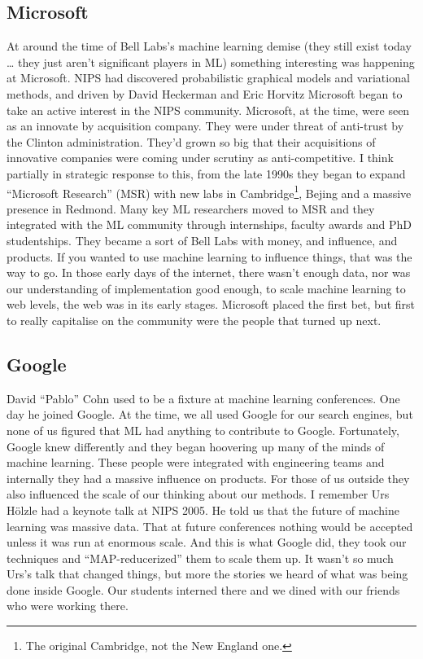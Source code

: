 \documentclass[a4paper]{caesar_book}
\begin{document}
\subsection{Microsoft}

At around the time of Bell Labs’s machine learning demise (they still exist today … they just aren't significant players in ML) something interesting was happening at Microsoft. NIPS had discovered probabilistic graphical models and variational methods, and driven by David Heckerman and Eric Horvitz Microsoft began to take an active interest in the NIPS community. Microsoft, at the time, were seen as an innovate by acquisition company. They were under threat of anti-trust by the Clinton administration. They’d grown so big that their acquisitions of innovative companies were coming under scrutiny as anti-competitive. I think partially in strategic response to this, from the late 1990s they began to expand “Microsoft Research” (MSR) with new labs in Cambridge\footnote{The original Cambridge, not the New England one.}, Bejing and a massive presence in Redmond. Many key ML researchers moved to MSR and they integrated with the ML community through internships, faculty awards and PhD studentships. They became a sort of Bell Labs with money, and influence, and products. If you wanted to use machine learning to influence things, that was the way to go. In those early days of the internet, there wasn’t enough data, nor was our understanding of implementation good enough, to scale machine learning to web levels, the web was in its early stages. Microsoft placed the first bet, but first to really capitalise on the community were the people that turned up next.

\subsection{Google}

David “Pablo” Cohn used to be a fixture at machine learning conferences. One day he joined Google. At the time, we all used Google for our search engines, but none of us figured that ML had anything to contribute to Google. Fortunately, Google knew differently and they began hoovering up many of the minds of machine learning. These people were integrated with engineering teams and internally they had a massive influence on products. For those of us outside they also influenced the scale of our thinking about our methods. I remember Urs Hölzle had a keynote talk at NIPS 2005. He told us that the future of machine learning was massive data. That at future conferences nothing would be accepted unless it was run at enormous scale. And this is what Google did, they took our techniques and “MAP-reducerized” them to scale them up. It wasn't so much Urs's talk that changed things, but more the stories we heard of what was being done inside Google. Our students interned there and we dined with our friends who were working there.
\end{document}
